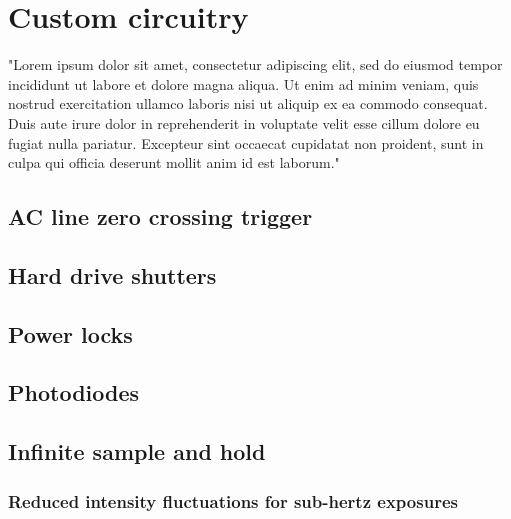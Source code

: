 \chapter{Custom circuitry}
"Lorem ipsum dolor sit amet, consectetur adipiscing elit, sed do eiusmod tempor incididunt ut labore et dolore magna aliqua. Ut enim ad minim veniam, quis nostrud exercitation ullamco laboris nisi ut aliquip ex ea commodo consequat. Duis aute irure dolor in reprehenderit in voluptate velit esse cillum dolore eu fugiat nulla pariatur. Excepteur sint occaecat cupidatat non proident, sunt in culpa qui officia deserunt mollit anim id est laborum."

\section{AC line zero crossing trigger}
\section{Hard drive shutters}
\section{Power locks}
\section{Photodiodes}
\section{Infinite sample and hold}
\subsection{Reduced intensity fluctuations for sub-hertz exposures}
